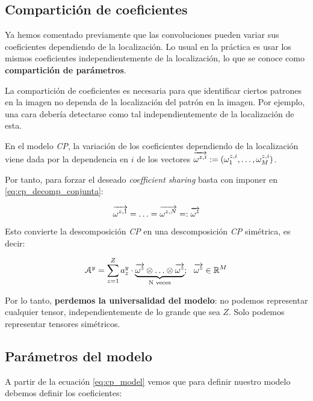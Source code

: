 \subsection{Compartición de coeficientes} \label{subs:comparticion_parametros_cp}

Ya hemos comentado previamente que las convoluciones pueden variar sus coeficientes dependiendo de la localización. Lo usual en la práctica es usar los mismos coeficientes independientemente de la localización, lo que se conoce como \textbf{compartición de parámetros}.

La compartición de coeficientes es necesaria para que identificar ciertos patrones en la imagen no dependa de la localización del patrón en la imagen. Por ejemplo, una cara debería detectarse como tal independientemente de la localización de esta.

En el modelo \textit{CP}, la variación de los coeficientes dependiendo de la localización viene dada por la dependencia en $i$ de los vectores $\overrightarrow{\omega^{z,i}} := (\omega^{z, i}_1, \ldots, \omega^{z, i}_M)$.

Por tanto, para forzar el deseado \textit{coefficient sharing} basta con imponer en \eqref{eq:cp_decomp_conjunta}:

\begin{equation}
    \overrightarrow{\omega^{z, 1}} = \ldots = \overrightarrow{\omega^{z, N}} =: \overrightarrow{\omega^z}
\end{equation}

Esto convierte la descomposición \textit{CP} en una descomposición \textit{CP} simétrica, es decir:

\begin{equation}
    \mathcal{A}^y = \sum_{z = 1}^Z a_z^y \cdot \underbrace{\overrightarrow{\omega^z} \otimes \ldots \otimes \overrightarrow{\omega^z}}_\textrm{N veces}; \ \  \overrightarrow{\omega^z} \in \mathbb{R}^M
\end{equation}

Por lo tanto, \textbf{perdemos la universalidad del modelo}: no podemos representar cualquier tensor, independientemente de lo grande que sea $Z$. Solo podemos representar tensores simétricos.

\subsection{Parámetros del modelo} \label{msubsec:parametros_modelo_cp}

A partir de la ecuación \eqref{eq:cp_model} vemos que para definir nuestro modelo debemos definir los coeficientes:

